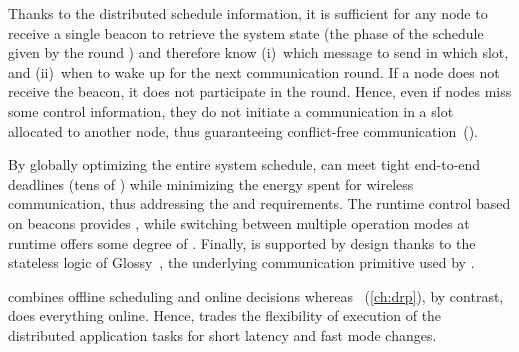 \begin{description}
	Thanks to the distributed schedule information, it is sufficient for any node to receive a single beacon to retrieve the system state (\ie the phase of the schedule given by the round \id) and therefore know
		(i)~which message to send in which slot, and
		(ii)~when to wake up for the next communication round.
	If a node does not receive the beacon, it does not participate in the round. Hence, even if nodes miss some control information, they do not initiate a communication in a slot allocated to another node, thus guaranteeing conflict-free communication~().

\end{description}

By globally optimizing the entire system schedule, \TTW can meet tight end-to-end deadlines (tens of \ms) while minimizing the energy spent for wireless communication, thus addressing the  and  requirements.
The runtime control based on beacons provides , while switching between multiple operation modes at runtime offers some degree of .
Finally,  is supported by design thanks to the stateless logic of Glossy~\cite{ferrari2011Glossy}, the underlying communication primitive used by \TTW.

\begin{remark}
	\TTW combines offline scheduling and online decisions whereas \DRP~(\cref{ch:drp}), by contrast, does everything online.
	Hence, \TTW trades the flexibility of execution of the distributed application tasks for short latency and fast mode changes.
\end{remark}
